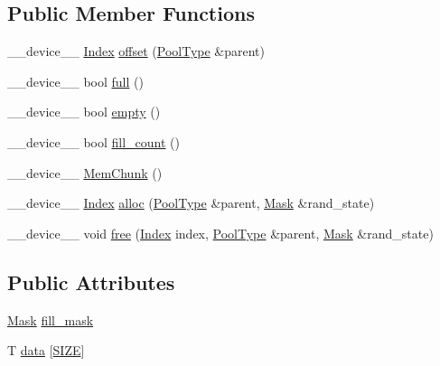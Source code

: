 \subsection*{Public Member Functions}
\begin{DoxyCompactItemize}
\item 
\-\_\-\-\_\-device\-\_\-\-\_\- \hyperlink{structutil_1_1MemChunk_a4f05352eb1c778a4791abe24d912b837}{Index} \hyperlink{structutil_1_1MemChunk_ac2e0f615524d9ab0fc1c60c4b801f8ae}{offset} (\hyperlink{structutil_1_1MemChunk_afd8dc8a7c608cfcaca89df49e5ff084b}{Pool\-Type} \&parent)
\item 
\-\_\-\-\_\-device\-\_\-\-\_\- bool \hyperlink{structutil_1_1MemChunk_a208ea160098d0b332582cbbc40e28ce3}{full} ()
\item 
\-\_\-\-\_\-device\-\_\-\-\_\- bool \hyperlink{structutil_1_1MemChunk_aa54e919956391efc337e120983d725f3}{empty} ()
\item 
\-\_\-\-\_\-device\-\_\-\-\_\- bool \hyperlink{structutil_1_1MemChunk_a546e52dc996e93d1f42e28b8834ba28f}{fill\-\_\-count} ()
\item 
\-\_\-\-\_\-device\-\_\-\-\_\- \hyperlink{structutil_1_1MemChunk_aa6c81cd21f1a759ebb4de400c63df786}{Mem\-Chunk} ()
\item 
\-\_\-\-\_\-device\-\_\-\-\_\- \hyperlink{structutil_1_1MemChunk_a4f05352eb1c778a4791abe24d912b837}{Index} \hyperlink{structutil_1_1MemChunk_a4b2dec740206f235b730a596548417c1}{alloc} (\hyperlink{structutil_1_1MemChunk_afd8dc8a7c608cfcaca89df49e5ff084b}{Pool\-Type} \&parent, \hyperlink{structutil_1_1MemChunk_a4ebe426d4977c2a9d95307cca65e3874}{Mask} \&rand\-\_\-state)
\item 
\-\_\-\-\_\-device\-\_\-\-\_\- void \hyperlink{structutil_1_1MemChunk_a996e130b24686b336e05b0a8ee9b312c}{free} (\hyperlink{structutil_1_1MemChunk_a4f05352eb1c778a4791abe24d912b837}{Index} index, \hyperlink{structutil_1_1MemChunk_afd8dc8a7c608cfcaca89df49e5ff084b}{Pool\-Type} \&parent, \hyperlink{structutil_1_1MemChunk_a4ebe426d4977c2a9d95307cca65e3874}{Mask} \&rand\-\_\-state)
\end{DoxyCompactItemize}
\subsection*{Public Attributes}
\begin{DoxyCompactItemize}
\item 
\hyperlink{structutil_1_1MemChunk_a4ebe426d4977c2a9d95307cca65e3874}{Mask} \hyperlink{structutil_1_1MemChunk_a78a7b9297f9bf281eef4c29b1d2b48f6}{fill\-\_\-mask}
\item 
T \hyperlink{structutil_1_1MemChunk_a0ff1b0148d66615bcd280b61eb96fcb0}{data} \mbox{[}\hyperlink{structutil_1_1MemChunk_af23d23ae810e7d52f138dd5a37a897ff}{S\-I\-Z\-E}\mbox{]}
\end{DoxyCompactItemize}
